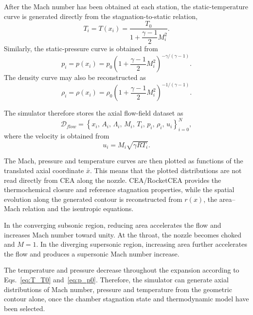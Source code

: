 \documentclass[11pt,a4paper]{article}
\begin{document}
After the Mach number has been obtained at each station, the static-temperature curve is generated directly from the stagnation-to-static relation,
\begin{equation}
T_i=T(x_i)=\frac{T_0}{1+\dfrac{\gamma-1}{2}M_i^2}.
\label{eq:temperature_curve}
\end{equation}
Similarly, the static-pressure curve is obtained from
\begin{equation}
p_i=p(x_i)=p_0
\left(1+\frac{\gamma-1}{2}M_i^2\right)^{-\gamma/(\gamma-1)}.
\label{eq:pressure_curve}
\end{equation}
The density curve may also be reconstructed as
\begin{equation}
\rho_i=\rho(x_i)=\rho_0
\left(1+\frac{\gamma-1}{2}M_i^2\right)^{-1/(\gamma-1)}.
\label{eq:density_curve}
\end{equation}

The simulator therefore stores the axial flow-field dataset as
\begin{equation}
\mathcal{D}_{flow}=\left\{x_i,\,A_i,\,\Lambda_i,\,M_i,\,T_i,\,p_i,\,\rho_i,\,u_i\right\}_{i=0}^{N},
\label{eq:flow_dataset}
\end{equation}
where the velocity is obtained from
\begin{equation}
u_i=M_i\sqrt{\gamma R T_i}.
\label{eq:velocity_curve}
\end{equation}

The Mach, pressure and temperature curves are then plotted as functions of the translated axial coordinate \(\bar{x}\). This means that the plotted distributions are not read directly from CEA along the nozzle. CEA/RocketCEA provides the thermochemical closure and reference stagnation properties, while the spatial evolution along the generated contour is reconstructed from \(r(x)\), the area--Mach relation and the isentropic equations.

In the converging subsonic region, reducing area accelerates the flow and increases Mach number toward unity. At the throat, the nozzle becomes choked and $M=1$. In the diverging supersonic region, increasing area further accelerates the flow and produces a supersonic Mach number increase.

The temperature and pressure decrease throughout the expansion according to Eqs.~\eqref{eq:T_T0} and~\eqref{eq:p_p0}. Therefore, the simulator can generate axial distributions of Mach number, pressure and temperature from the geometric contour alone, once the chamber stagnation state and thermodynamic model have been selected.
\end{document}
